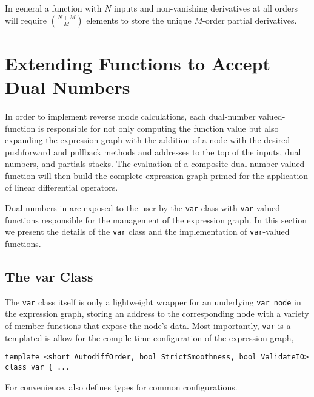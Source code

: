 In general a function with $N$ inputs and non-vanishing derivatives at
all orders will require $\binom{N + M}{M}$ elements to store the unique
$M$-order partial derivatives.

\section{Extending Functions to Accept Dual Numbers}

In order to implement reverse mode calculations, each dual-number 
valued-function is responsible for not only computing the function
value but also expanding the expression graph with the addition of
a node with the desired pushforward and pullback methods and
addresses to the top of the inputs, dual numbers, and partials stacks.
The evaluation of a composite dual number-valued function will then
build the complete expression graph primed for the application of
linear differential operators.

Dual numbers in \nomad are exposed to the user by the \verb|var|
class with \verb|var|-valued functions responsible for the management
of the expression graph.  In this section we present the details of
the \verb|var| class and the implementation of \verb|var|-valued functions.

\subsection{The var Class}

The \verb|var| class itself is only a lightweight wrapper for an underlying 
\verb|var_node| in the expression graph, storing an address to the 
corresponding node with a variety of member functions that expose the 
node's data.  Most importantly, \verb|var| is a templated is allow for
the compile-time configuration of the expression graph,
%
\begin{verbatim}
template <short AutodiffOrder, bool StrictSmoothness, bool ValidateIO>
class var { ...
\end{verbatim}
%
For convenience, \nomad also defines types for common configurations.


